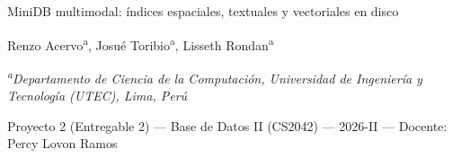 \documentclass[11pt,a4paper]{article}
\begin{document}
\thispagestyle{plain}
\begin{center}
{\LARGE MiniDB multimodal: índices espaciales, textuales y vectoriales en disco\par}
\vspace{1.4em}
{\large Renzo Acervo\textsuperscript{a}, Josué Toribio\textsuperscript{a}, Lisseth Rondan\textsuperscript{a}\par}
\vspace{1em}
{\small\itshape \textsuperscript{a}Departamento de Ciencia de la Computación, Universidad de Ingeniería y
Tecnología (UTEC), Lima, Perú\par}
\vspace{0.5em}
{\small Proyecto 2 (Entregable 2) --- Base de Datos II (CS2042) --- 2026-II --- Docente: Percy Lovon Ramos\par}
\end{center}
\end{document}
